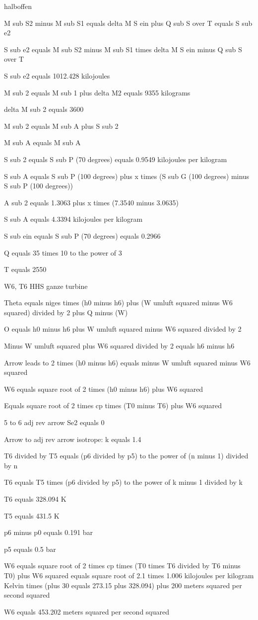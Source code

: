 halboffen

M sub S2 minus M sub S1 equals delta M S ein plus Q sub S over T equals S sub e2

S sub e2 equals M sub S2 minus M sub S1 times delta M S ein minus Q sub S over T

S sub e2 equals 1012.428 kilojoules

M sub 2 equals M sub 1 plus delta M2 equals 9355 kilograms

delta M sub 2 equals 3600

M sub 2 equals M sub A plus S sub 2

M sub A equals M sub A

S sub 2 equals S sub P (70 degrees) equals 0.9549 kilojoules per kilogram

S sub A equals S sub P (100 degrees) plus x times (S sub G (100 degrees) minus S sub P (100 degrees))

A sub 2 equals 1.3063 plus x times (7.3540 minus 3.0635)

S sub A equals 4.3394 kilojoules per kilogram

S sub ein equals S sub P (70 degrees) equals 0.2966

Q equals 35 times 10 to the power of 3

T equals 2550

W6, T6
HHS ganze turbine

Theta equals niges times (h0 minus h6) plus (W umluft squared minus W6 squared) divided by 2 plus Q minus (W)

O equals h0 minus h6 plus W umluft squared minus W6 squared divided by 2

Minus W umluft squared plus W6 squared divided by 2 equals h6 minus h6

Arrow leads to 2 times (h0 minus h6) equals minus W umluft squared minus W6 squared

W6 equals square root of 2 times (h0 minus h6) plus W6 squared

Equals square root of 2 times cp times (T0 minus T6) plus W6 squared

5 to 6 adj rev arrow Se2 equals 0

Arrow to adj rev arrow isotrope: k equals 1.4

T6 divided by T5 equals (p6 divided by p5) to the power of (n minus 1) divided by n

T6 equals T5 times (p6 divided by p5) to the power of k minus 1 divided by k

T6 equals 328.094 K

T5 equals 431.5 K

p6 minus p0 equals 0.191 bar

p5 equals 0.5 bar

W6 equals square root of 2 times cp times (T0 times T6 divided by T6 minus T0) plus W6 squared equals square root of 2.1 times 1.006 kilojoules per kilogram Kelvin times (plus 30 equals 273.15 plus 328.094) plus 200 meters squared per second squared

W6 equals 453.202 meters squared per second squared